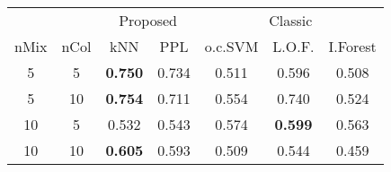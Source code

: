 
\begin{tabular}{ccccccc}
\toprule
\multicolumn{2}{c}{ } & \multicolumn{2}{c}{Proposed} & \multicolumn{3}{c}{Classic} \\
\cmidrule(l{3pt}r{3pt}){3-4} \cmidrule(l{3pt}r{3pt}){5-7}
nMix & nCol & kNN & PPL & o.c.SVM & L.O.F. & I.Forest\\
\midrule
5 & 5 & {\bf 0.750} & 0.734 & 0.511 & 0.596 & 0.508\\
5 & 10 & {\bf 0.754} & 0.711 & 0.554 & 0.740 & 0.524\\
10 & 5 & 0.532 & 0.543 & 0.574 & {\bf 0.599} & 0.563\\
10 & 10 & {\bf 0.605} & 0.593 & 0.509 & 0.544 & 0.459\\
\bottomrule
\end{tabular}